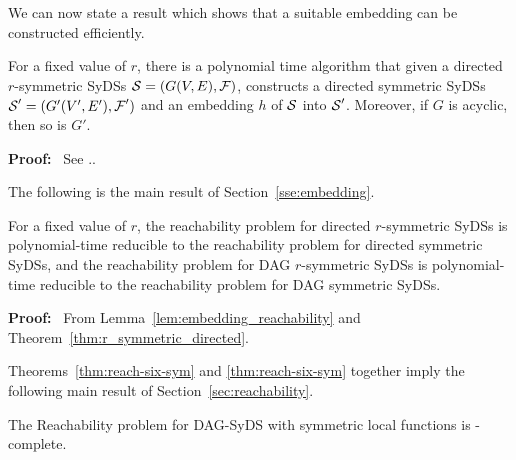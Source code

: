 We can now state a result which shows that a suitable embedding
can be constructed efficiently.

\begin{theorem}\label{thm:r_symmetric_directed}
For a fixed value of $r$, there is a polynomial time algorithm that
given a directed $r$-symmetric SyDSs $\mbox{$\mathcal{S}$} = (G(V,E), \mbox{$\mathcal{F}$})$,
constructs a directed symmetric SyDSs $\mbox{$\mathcal{S}$}' = (G'(V',E'), \mbox{$\mathcal{F}$}')$
and an embedding $h$ of $\mbox{$\mathcal{S}$}$ into $\mbox{$\mathcal{S}$}'$.  Moreover, if  $G$
is acyclic, then so is $G'$.  
\end{theorem}

\noindent
\textbf{Proof:}~ See \cite{Rosenkrantz-etal-2020}..

\smallskip

The following is the main result of Section~\ref{sse:embedding}.

\begin{theorem}\label{thm:reachability_symmetric}
For a fixed value of $r$, the reachability problem for directed
$r$-symmetric  SyDSs is polynomial-time reducible to the reachability
problem for directed symmetric SyDSs, and  the reachability problem
for DAG $r$-symmetric  SyDSs is polynomial-time reducible to the
reachability problem for DAG  symmetric  SyDSs.  
\end{theorem}

\noindent 
\textbf{Proof:}~ From Lemma~\ref{lem:embedding_reachability}
and Theorem~\ref{thm:r_symmetric_directed}.  \QED

\smallskip

Theorems~\ref{thm:reach-six-sym} and \ref{thm:reach-six-sym}
together imply the following main result
of Section~\ref{sec:reachability}.

\begin{theorem}\label{thm:dag_syds_sym_hard}
The Reachability problem for DAG-SyDS with symmetric local functions is
\cpsp-complete. \QED
\end{theorem}

